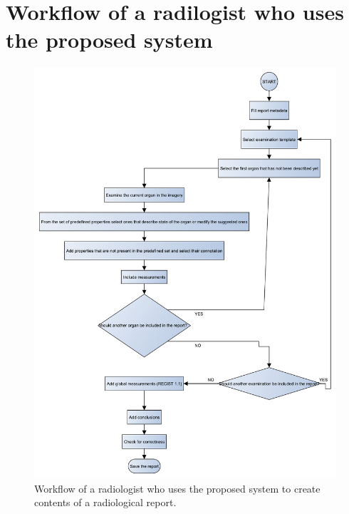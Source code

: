 \documentclass[12pt, twoside, openany]{report}
\theoremstyle{definition}
\begin{document}
\section{Workflow of a radilogist who uses the proposed system}
\begin{figure}
    \centering
    \includegraphics[width=\linewidth]{report-workflow.pdf}
    \caption{Workflow of a radiologist who uses the proposed system to create contents of a radiological report.
        \label{fig:report-workflow}
    }
\end{figure}
\end{document}
